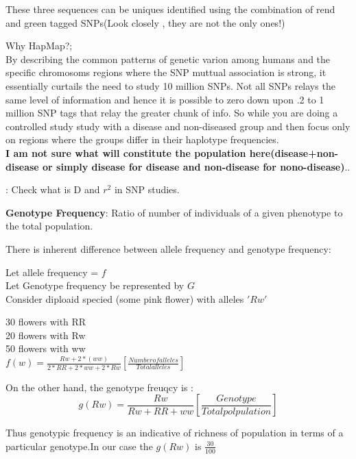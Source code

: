 \documentclass[a4paper]{article}
\begin{document}
These three sequences can be uniques identified using the combination of rend and green tagged SNPs(Look closely , they are not the only ones!)

Why HapMap?;\\
By describing the common patterns of genetic varion among humans and the specific chromosoms regions where the SNP muttual association is strong, it essentially curtails the need to study 10 million SNPs. Not all SNPs relays the same level of information and hence it is possible to zero down upon .2 to 1 million SNP tags that relay the greater chunk of info. So while you are doing a controlled study study with a disease and non-diseased group  and then focus only on regions where the groups differ in their haplotype frequencies. \\
{\color{blue}\textbf{I am not sure what will constitute the population here(disease+non-disease or simply disease for disease and non-disease for nono-disease)}}..

{\color{red}{TODO}: Check what is D and $r^2$ in SNP studies.}

\textbf{Genotype Frequency}: Ratio of number of individuals of a given phenotype to the total population.

There is inherent difference between allele frequency and genotype frequency:

Let  allele frequency = $f$ \\
Let Genotype frequency be represented by $G$ \\

Consider diploaid specied (some pink flower) with alleles $'Rw'$

30 flowers with RR\\
20 flowers with Rw\\
50 flowers with ww\\

\begin{math}
f(w) = \frac{Rw+2*(ww)}{2*RR+2*ww+2*Rw} [\frac{Number of  alleles}{Total alleles}]
\end{math}

On the other hand, the genotype freuqcy is :\\
\begin{equation}
g(Rw)=\frac{Rw}{Rw+RR+ww}[\frac{Genotype}{Total polpulation}]
\end{equation}

Thus genotypic frequency is an indicative of richness of population in terms of a particular genotype.In our case
the $g(Rw)$ is $\frac{30}{100}$
\end{document}
